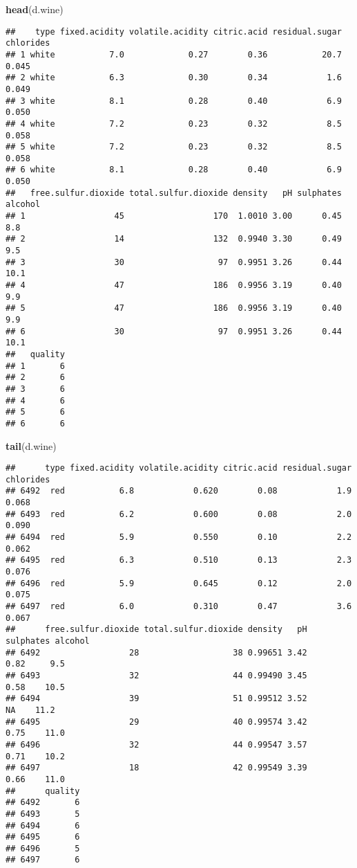 \documentclass[
]{article}
\newenvironment{Shaded}{\begin{snugshade}}{\end{snugshade}}
\newcommand{\KeywordTok}[1]{\textcolor[rgb]{0.13,0.29,0.53}{\textbf{#1}}}
\newcommand{\NormalTok}[1]{#1}
\begin{document}
\begin{Shaded}
\begin{Highlighting}[]
\KeywordTok{head}\NormalTok{(d.wine)}
\end{Highlighting}
\end{Shaded}

\begin{verbatim}
##    type fixed.acidity volatile.acidity citric.acid residual.sugar chlorides
## 1 white           7.0             0.27        0.36           20.7     0.045
## 2 white           6.3             0.30        0.34            1.6     0.049
## 3 white           8.1             0.28        0.40            6.9     0.050
## 4 white           7.2             0.23        0.32            8.5     0.058
## 5 white           7.2             0.23        0.32            8.5     0.058
## 6 white           8.1             0.28        0.40            6.9     0.050
##   free.sulfur.dioxide total.sulfur.dioxide density   pH sulphates alcohol
## 1                  45                  170  1.0010 3.00      0.45     8.8
## 2                  14                  132  0.9940 3.30      0.49     9.5
## 3                  30                   97  0.9951 3.26      0.44    10.1
## 4                  47                  186  0.9956 3.19      0.40     9.9
## 5                  47                  186  0.9956 3.19      0.40     9.9
## 6                  30                   97  0.9951 3.26      0.44    10.1
##   quality
## 1       6
## 2       6
## 3       6
## 4       6
## 5       6
## 6       6
\end{verbatim}

\begin{Shaded}
\begin{Highlighting}[]
\KeywordTok{tail}\NormalTok{(d.wine)}
\end{Highlighting}
\end{Shaded}

\begin{verbatim}
##      type fixed.acidity volatile.acidity citric.acid residual.sugar chlorides
## 6492  red           6.8            0.620        0.08            1.9     0.068
## 6493  red           6.2            0.600        0.08            2.0     0.090
## 6494  red           5.9            0.550        0.10            2.2     0.062
## 6495  red           6.3            0.510        0.13            2.3     0.076
## 6496  red           5.9            0.645        0.12            2.0     0.075
## 6497  red           6.0            0.310        0.47            3.6     0.067
##      free.sulfur.dioxide total.sulfur.dioxide density   pH sulphates alcohol
## 6492                  28                   38 0.99651 3.42      0.82     9.5
## 6493                  32                   44 0.99490 3.45      0.58    10.5
## 6494                  39                   51 0.99512 3.52        NA    11.2
## 6495                  29                   40 0.99574 3.42      0.75    11.0
## 6496                  32                   44 0.99547 3.57      0.71    10.2
## 6497                  18                   42 0.99549 3.39      0.66    11.0
##      quality
## 6492       6
## 6493       5
## 6494       6
## 6495       6
## 6496       5
## 6497       6
\end{verbatim}
\end{document}
